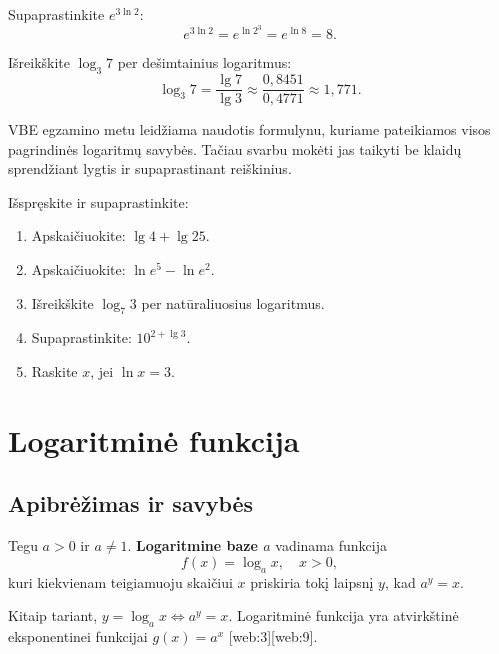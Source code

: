 \begin{example}
Supaprastinkite $e^{3\ln 2}$:
\[
e^{3\ln 2} = e^{\ln 2^3} = e^{\ln 8} = 8.
\]
\end{example}

\begin{example}
Išreikškite $\log_3 7$ per dešimtainius logaritmus:
\[
\log_3 7 = \frac{\lg 7}{\lg 3} \approx \frac{0{,}8451}{0{,}4771} \approx 1{,}771.
\]
\end{example}

\begin{remark}
VBE egzamino metu leidžiama naudotis formulynu, kuriame pateikiamos visos pagrindinės logaritmų savybės. Tačiau svarbu mokėti jas taikyti be klaidų sprendžiant lygtis ir supaprastinant reiškinius.
\end{remark}

\begin{exercise}
Išspręskite ir supaprastinkite:
\begin{enumerate}[label=\arabic*.]
    \item Apskaičiuokite: $\lg 4 + \lg 25$.
    \item Apskaičiuokite: $\ln e^5 - \ln e^2$.
    \item Išreikškite $\log_7 3$ per natūraliuosius logaritmus.
    \item Supaprastinkite: $10^{2 + \lg 3}$.
    \item Raskite $x$, jei $\ln x = 3$.
\end{enumerate}
\end{exercise}


\section{Logaritminė funkcija}

\subsection{Apibrėžimas ir savybės}

\begin{definition}
Tegu $a > 0$ ir $a \neq 1$. \textbf{Logaritmine baze $a$} vadinama funkcija
\[
f(x) = \log_a x, \quad x > 0,
\]
kuri kiekvienam teigiamuoju skaičiui $x$ priskiria tokį laipsnį $y$, kad $a^y = x$.
\end{definition}

Kitaip tariant, $y = \log_a x \iff a^y = x$. Logaritminė funkcija yra atvirkštinė eksponentinei funkcijai $g(x) = a^x$ [web:3][web:9].

